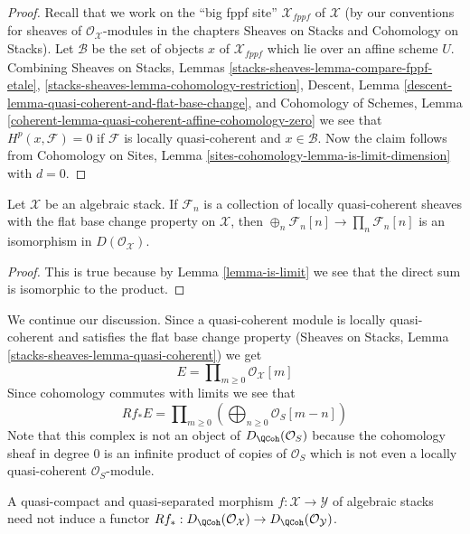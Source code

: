\begin{proof}
Recall that we work on the ``big fppf site'' $\mathcal{X}_{fppf}$
of $\mathcal{X}$ (by our conventions
for sheaves of $\mathcal{O}_\mathcal{X}$-modules in the chapters
Sheaves on Stacks and Cohomology on Stacks). Let $\mathcal{B}$ be the set
of objects $x$ of $\mathcal{X}_{fppf}$ which lie over an affine scheme $U$. 
Combining
Sheaves on Stacks, Lemmas
\ref{stacks-sheaves-lemma-compare-fppf-etale},
\ref{stacks-sheaves-lemma-cohomology-restriction},
Descent, Lemma \ref{descent-lemma-quasi-coherent-and-flat-base-change},
and
Cohomology of Schemes, Lemma
\ref{coherent-lemma-quasi-coherent-affine-cohomology-zero}
we see that $H^p(x, \mathcal{F}) = 0$ if $\mathcal{F}$ is
locally quasi-coherent and $x \in \mathcal{B}$.
Now the claim follows from
Cohomology on Sites, Lemma \ref{sites-cohomology-lemma-is-limit-dimension}
with $d = 0$.
\end{proof}

\begin{lemma}
\label{lemma-sum-is-product}
Let $\mathcal{X}$ be an algebraic stack. If $\mathcal{F}_n$ is a collection
of locally quasi-coherent sheaves with the flat base change property on
$\mathcal{X}$, then $\oplus_n \mathcal{F}_n[n] \to \prod_n \mathcal{F}_n[n]$
is an isomorphism in $D(\mathcal{O}_\mathcal{X})$.
\end{lemma}

\begin{proof}
This is true because by Lemma \ref{lemma-is-limit} we see that the direct sum
is isomorphic to the product.
\end{proof}

\noindent
We continue our discussion. Since a quasi-coherent module is locally
quasi-coherent and satisfies the flat base change property
(Sheaves on Stacks, Lemma \ref{stacks-sheaves-lemma-quasi-coherent}) we get
$$
E = \prod\nolimits_{m \geq 0} \mathcal{O}_\mathcal{X}[m]
$$
Since cohomology commutes
with limits we see that
$$
Rf_*E = \prod\nolimits_{m \geq 0}
\left(\bigoplus\nolimits_{n \geq 0} \mathcal{O}_S[m - n]\right)
$$
Note that this complex is not an object of $D_\QCoh(\mathcal{O}_S)$
because the cohomology sheaf in degree $0$ is an infinite product of copies
of $\mathcal{O}_S$ which is not even a locally quasi-coherent
$\mathcal{O}_S$-module.

\begin{lemma}
\label{lemma-push-not-OK}
A quasi-compact and quasi-separated morphism
$f : \mathcal{X} \to \mathcal{Y}$ of algebraic stacks
need not induce a functor
$Rf_* : D_\QCoh(\mathcal{O}_\mathcal{X}) \to
D_\QCoh(\mathcal{O}_\mathcal{Y})$.
\end{lemma}

